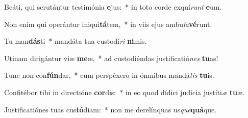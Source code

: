 \item Beáti, qui scrutántur testimónia \textbf{e}jus:~* in toto corde exquí\textit{runt} \textbf{e}um.
\item Non enim qui operántur iniqui\textbf{tá}tem,~* in viis ejus ambu\textit{la}\textbf{vé}runt.
\item Tu man\textbf{dás}ti~* mandáta tua custodí\textit{ri} \textbf{ni}mis.
\item Utinam dirigántur viæ \textbf{me}æ,~* ad custodiéndas justificatió\textit{nes} \textbf{tu}as!
\item Tunc non con\textbf{fún}dar,~* cum perspéxero in ómnibus mandá\textit{tis} \textbf{tu}is.
\item Confitébor tibi in directióne \textbf{cor}dis:~* in eo quod dídici judícia justíti\textit{æ} \textbf{tu}æ.
\item Justificatiónes tuas cus\textbf{tó}diam:~* non me derelínquas us\textit{que}\textbf{quá}que.
